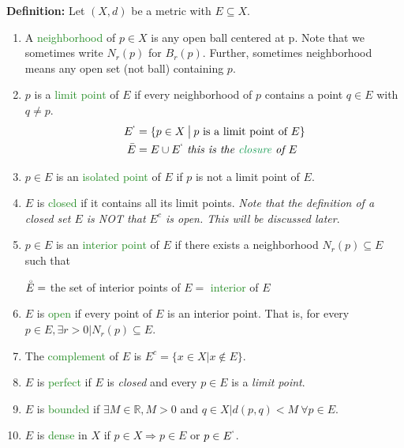 \documentclass{article}
\newcommand{\Divides}{\mathbin{\big|}}
\begin{document}
\textbf{Definition:} Let $(X,d)$ be a metric with $E \subseteq X$.
\begin{enumerate}
    \item A \textcolor{ForestGreen}{neighborhood} of $p \in X$ is any open ball centered at p. Note that we sometimes write $N_r(p)$ for $B_r(p)$. Further, sometimes neighborhood means any open set (not ball) containing $p$.
    \item $p$ is a \textcolor{ForestGreen}{limit point} of $E$ if every neighborhood of $p$ contains a point $q \in E$ with $q \neq p$.
    \begin{align*}
        E^` &= \{p \in X \Divides p \ \text{is a limit point of }E\}\\
        \bar{E} &= E \cup E^` \ \textit{this is the \textcolor{ForestGreen}{closure} of } E
    \end{align*}
    \item $p \in E$ is an \textcolor{ForestGreen}{isolated point} of $E$ if $p$ is not a limit point of $E$.
    \item $E$ is \textcolor{ForestGreen}{closed} if it contains all its limit points. \textit{Note that the definition of a closed set $E$ is NOT that $E^c$ is open. This will be discussed later}.
    \item $p \in E$ is an \textcolor{ForestGreen}{interior point} of $E$ if there exists a neighborhood $N_r(p) \subseteq E$ such that 
    \begin{center}
        $\accentset{\circ}{E} =$ the set of interior points of $E=$ \textcolor{ForestGreen}{interior} of $E$
    \end{center}
    \item $E$ is \textcolor{ForestGreen}{open} if every point of $E$ is an interior point. That is, for every $p \in E, \exists r > 0 \Divides N_r(p) \subseteq E$.
    \item The \textcolor{ForestGreen}{complement} of $E$ is $E^c = \{x \in X \Divides x \notin E\}$.
    \item $E$ is \textcolor{ForestGreen}{perfect} if $E$ is \textit{closed} and every $p \in E$ is a \textit{limit point}.
    \item $E$ is \textcolor{ForestGreen}{bounded} if $\exists M \in \mathbb{R}, M > 0$ and $q \in X \Divides d(p,q) < M \ \forall p \in E$.
    \item $E$ is \textcolor{ForestGreen}{dense} in $X$ if $p \in X \Longrightarrow p \in E$ or $p \in E^`$.
\end{enumerate}
\end{document}
